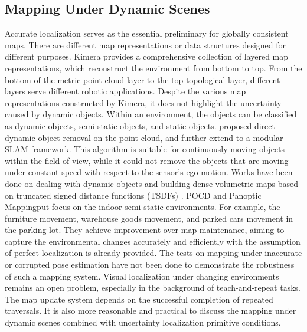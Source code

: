 \subsection{Mapping Under Dynamic Scenes}
Accurate localization serves as the essential preliminary for globally consistent maps. There are different map representations or data structures designed for different purposes. Kimera\cite{Rosinol20icra-Kimera} provides a comprehensive collection of layered map representations, which reconstruct the environment from bottom to top. From the bottom of the metric point cloud layer to the top topological layer, different layers serve different robotic applications. Despite the various map representations constructed by Kimera, it does not highlight the uncertainty caused by dynamic objects. Within an environment, the objects can be classified as dynamic objects, semi-static objects, and static objects.
\cite{kim2020remove} proposed direct dynamic object removal on the point cloud, and further extend to a modular SLAM framework\cite{9811916}. This algorithm is suitable for continuously moving objects within the field of view, while it could not remove the objects that are moving under constant speed with respect to the sensor's ego-motion. Works have been done on dealing with dynamic objects and building dense volumetric maps based on truncated signed distance functions (TSDFs) \cite{schmid2022panoptic,grinvald2021tsdf,fehr2017tsdf,oleynikova2017voxblox,qian2022pocd}. POCD\cite{qian2022pocd} and Panoptic Mapping\cite{schmid2022panoptic}put focus on the indoor semi-static environments. For example, the furniture movement, warehouse goods movement, and parked cars movement in the parking lot. They achieve improvement over map maintenance, aiming to capture the environmental changes accurately and efficiently with the assumption of perfect localization is already provided. The tests on mapping under inaccurate or corrupted pose estimation have not been done to demonstrate the robustness of such a mapping system. Visual localization under changing environments remains an open problem, especially in the background of teach-and-repeat tasks. The map update system depends on the successful completion of repeated traversals. It is also more reasonable and practical to discuss the mapping under dynamic scenes combined with uncertainty localization primitive conditions.